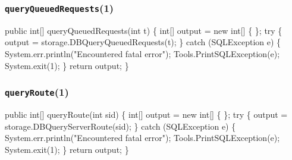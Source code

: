 \documentclass{article}
\def\nwendcode{\endtrivlist \endgroup}      %
\let\nwdocspar=\par
\begin{document}
\subsubsection{{\tt{}\protect{}queryQueuedRequests}(1)}
\nwenddocs{}\endmoddef{}
public int[] queryQueuedRequests(int t) \{
  int[] output = new int[] \{ \};
  try \{
    output = storage.DBQueryQueuedRequests(t);
  \} catch (SQLException e) \{
    System.err.println("Encountered fatal error");
    Tools.PrintSQLException(e);
    System.exit(1);
  \}
  return output;
\}
\eatline
{}\nwendcode{}\nwdocspar
\subsubsection{{\tt{}\protect{}queryRoute}(1)}
\nwenddocs{}\endmoddef{}
public int[] queryRoute(int sid) \{
  int[] output = new int[] \{ \};
  try \{
    output = storage.DBQueryServerRoute(sid);
  \} catch (SQLException e) \{
    System.err.println("Encountered fatal error");
    Tools.PrintSQLException(e);
    System.exit(1);
  \}
  return output;
\}
\eatline
{}\nwendcode{}\nwdocspar
\end{document}
